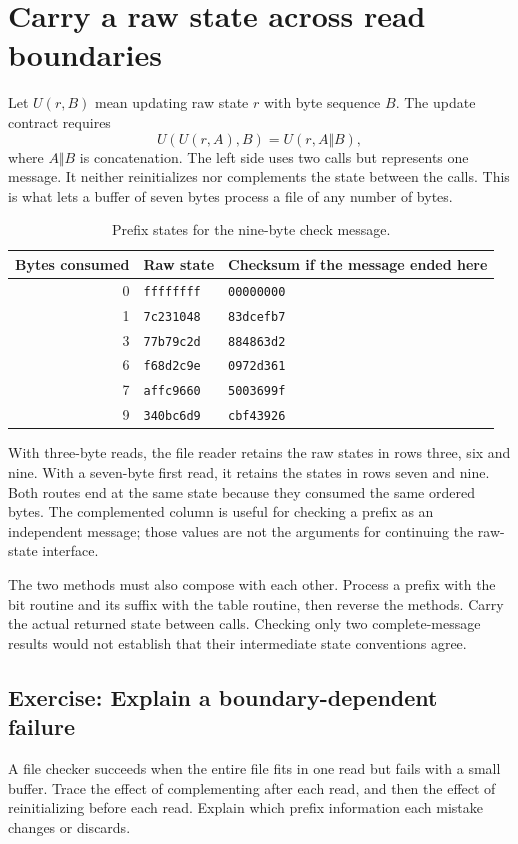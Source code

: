 \section{Carry a raw state across read boundaries}
Let \(U(r,B)\) mean updating raw state \(r\) with byte sequence \(B\). The update
contract requires
\[
  U(U(r,A),B)=U(r,A\Vert B),
\]
where \(A\Vert B\) is concatenation. The left side uses two calls but represents
one message. It neither reinitializes nor complements the state between the calls.
This is what lets a buffer of seven bytes process a file of any number of bytes.

\begin{table}[htbp]
  \centering
  \caption{Prefix states for the nine-byte check message.}
  \begin{tabular}{rll}
    \toprule
    Bytes consumed & Raw state         & Checksum if the message ended here \\
    \midrule
    0              & \texttt{ffffffff} & \texttt{00000000}                  \\
    1              & \texttt{7c231048} & \texttt{83dcefb7}                  \\
    3              & \texttt{77b79c2d} & \texttt{884863d2}                  \\
    6              & \texttt{f68d2c9e} & \texttt{0972d361}                  \\
    7              & \texttt{affc9660} & \texttt{5003699f}                  \\
    9              & \texttt{340bc6d9} & \texttt{cbf43926}                  \\
    \bottomrule
  \end{tabular}
\end{table}

With three-byte reads, the file reader retains the raw states in rows three, six and
nine. With a seven-byte first read, it retains the states in rows seven and nine.
Both routes end at the same state because they consumed the same ordered bytes.
The complemented column is useful for checking a prefix as an independent message;
those values are not the arguments for continuing the raw-state interface.

The two methods must also compose with each other. Process a prefix with the bit
routine and its suffix with the table routine, then reverse the methods. Carry the
actual returned state between calls. Checking only two complete-message results would
not establish that their intermediate state conventions agree.

\subsection*{Exercise: Explain a boundary-dependent failure}
A file checker succeeds when the entire file fits in one read but fails with a small
buffer. Trace the effect of complementing after each read, and then the effect of
reinitializing before each read. Explain which prefix information each mistake changes
or discards.
